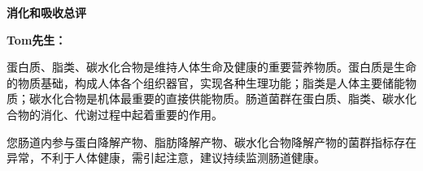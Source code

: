 

\usepackage{graphicx}
\graphicspath{{cores/}}



\setlength{\arrayrulewidth}{0.5pt}
\fontsize{9.3pt}{17pt}\selectfont
\color{gray2}

\vspace*{0mm}
\begin{center}
{\bf\sanhao 消化和吸收总评}
\end{center}

\medskip

\noindent
{\bf\xiaosihao Tom先生：}


\bigskip

蛋白质、脂类、碳水化合物是维持人体生命及健康的重要营养物质。蛋白质是生命的物质基础，构成人体各个组织器官，实现各种生理功能；脂类是人体主要储能物质；碳水化合物是机体最重要的直接供能物质。肠道菌群在蛋白质、脂类、碳水化合物的消化、代谢过程中起着重要的作用。

您肠道内参与蛋白降解产物、脂肪降解产物、碳水化合物降解产物的菌群指标存在异常，不利于人体健康，需引起注意，建议持续监测肠道健康。

